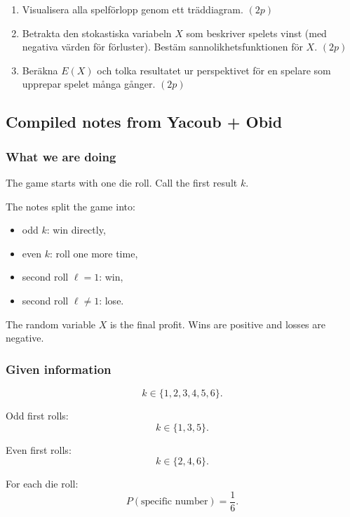 \documentclass[10pt]{article}
\begin{document}
\begin{enumerate}[label=\alph*)]
\item Visualisera alla spelförlopp genom ett
träddiagram. \((2p)\)

\item Betrakta den stokastiska variabeln \(X\) som
beskriver spelets vinst (med negativa värden för
förluster). Bestäm sannolikhetsfunktionen för \(X\).
\((2p)\)

\item Beräkna \(E(X)\) och tolka resultatet ur
perspektivet för en spelare som upprepar spelet
många gånger. \((2p)\)
\end{enumerate}

\subsection*{Compiled notes from Yacoub + Obid}

\subsubsection*{What we are doing}

The game starts with one die roll.
Call the first result \(k\).

The notes split the game into:
\begin{itemize}
\item odd \(k\): win directly,
\item even \(k\): roll one more time,
\item second roll \(\ell=1\): win,
\item second roll \(\ell\ne 1\): lose.
\end{itemize}

The random variable \(X\) is the final profit.
Wins are positive and losses are negative.

\subsubsection*{Given information}

\[
k\in\{1,2,3,4,5,6\}.
\]

Odd first rolls:
\[
k\in\{1,3,5\}.
\]

Even first rolls:
\[
k\in\{2,4,6\}.
\]

For each die roll:
\[
P(\text{specific number})=\frac{1}{6}.
\]
\end{document}
